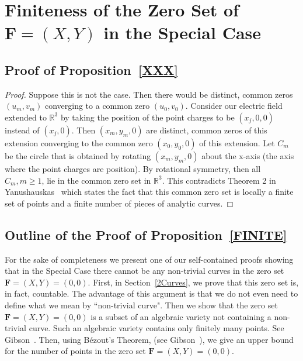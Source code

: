 \documentclass{article}
\theoremstyle{remark}
\numberwithin{equation}{section}
\begin{document}
\section{Finiteness of the Zero Set of ${\mathbf F}=(X,Y)$ in the Special Case}\label{Curves}


\subsection{Proof of Proposition~\ref{XXX}\label{subsec3.1}}

\begin{proof}  Suppose this is not the case.  Then there would be distinct, common zeros $(u_m,v_m)$ converging to a common zero $(u_0,v_0)$. 
Consider our electric field extended to ${\mathbb R}^3$ by taking the position of the point charges to be $(x_j,0,0)$ instead of $(x_j,0)$. Then $(x_m,y_m,0)$
are distinct, common zeros of this extension converging to the common zero $(x_0,y_0,0)$ of this extension. Let $C_m$ be the circle
that is obtained by rotating $(x_m,y_m, 0)$  about the x-axis (the axis where the point charges are position).  By rotational
symmetry, then all $C_m, m \geq 1$, lie in the common zero set in ${\mathbb R}^3$.  This contradicts Theorem 2 in Yanushauskas~\cite{Jan} which states
the fact that this common zero set is locally a finite set of points and a finite number of pieces of analytic curves.
\end{proof}

\subsection{Outline of the Proof of Proposition~\ref{FINITE}}\label{subsec3.2}

For the sake of completeness we present one of our self-contained proofs showing that in the Special Case there cannot be any non-trivial curves
in the zero set ${\mathbf F}=(X,Y)=(0,0)$. First, in Section~\ref{2Curves}, we prove that this zero set is, in fact, countable. The advantage of this 
argument is that we do not even need to define what we mean by ``non-trivial curve". Then we show that the zero set ${\mathbf F}=(X,Y) = (0,0)$ is a subset 
of an algebraic variety not containing a non-trivial curve. Such an algebraic variety contains only finitely many points. See Gibson~\cite{Gibson}.
Then, using B\'ezout's Theorem, (see Gibson~\cite{Gibson}), we give an upper bound for the number of points in the zero set ${\mathbf F}=(X,Y)=(0,0)$.
\end{document}
